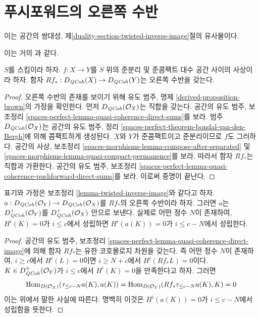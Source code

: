 \section{푸시포워드의 오른쪽 수반}
\label{section-twisted-inverse-image}

\noindent
이는 공간의 쌍대성, 제\ref{duality-section-twisted-inverse-image}절의
유사물이다.

\begin{lemma}
\label{lemma-twisted-inverse-image}
\begin{reference}
이는 거의 \cite[Example 4.2]{Neeman-Grothendieck}과 같다.
\end{reference}
$S$를 스킴이라 하자.
$f : X \to Y$를 $S$ 위의 준분리 및 준콤팩트 대수 공간 사이의 사상이라 하자.
함자 $Rf_* : D_{\mathit{QCoh}}(X) \to D_{\mathit{QCoh}}(Y)$는 오른쪽 수반을 갖는다.
\end{lemma}

\begin{proof}
오른쪽 수반의 존재를 보이기 위해
유도 범주, 명제 \ref{derived-proposition-brown}의 가정을 확인한다.
먼저 $D_{\mathit{QCoh}}(\mathcal{O}_X)$는 직합을 갖는다. 공간의 유도 범주, 보조정리
\ref{spaces-perfect-lemma-quasi-coherence-direct-sums}를 보라.
범주 $D_{\mathit{QCoh}}(\mathcal{O}_X)$는 공간의 유도 범주, 정리
\ref{spaces-perfect-theorem-bondal-van-den-Bergh}에 의해 콤팩트하게 생성된다.
$X$와 $Y$가 준콤팩트이고 준분리이므로 $f$도 그러하다. 공간의 사상, 보조정리
\ref{spaces-morphisms-lemma-compose-after-separated} 및
\ref{spaces-morphisms-lemma-quasi-compact-permanence}를 보라.
따라서 함자 $Rf_*$는 직합과 가환한다. 공간의 유도 범주, 보조정리
\ref{spaces-perfect-lemma-quasi-coherence-pushforward-direct-sums}를 보라.
이로써 증명이 끝난다.
\end{proof}

\begin{lemma}
\label{lemma-twisted-inverse-image-bounded-below}
표기와 가정은 보조정리 \ref{lemma-twisted-inverse-image}와 같다고 하자.
$a : D_{\mathit{QCoh}}(\mathcal{O}_Y) \to D_{\mathit{QCoh}}(\mathcal{O}_X)$를
$Rf_*$의 오른쪽 수반이라 하자. 그러면 $a$는
$D^+_{\mathit{QCoh}}(\mathcal{O}_Y)$를 $D^+_{\mathit{QCoh}}(\mathcal{O}_X)$ 안으로 보낸다.
실제로 어떤 정수 $N$이 존재하여,
$H^i(K) = 0$가 $i \leq c$에서 성립하면
$H^i(a(K)) = 0$가 $i \leq c - N$에서 성립한다.
\end{lemma}

\begin{proof}
공간의 유도 범주, 보조정리
\ref{spaces-perfect-lemma-quasi-coherence-direct-image}에 의해 함자
$Rf_*$는 유한 코호몰로지 차원을 갖는다. 즉 어떤 정수 $N$이 존재하여,
$i \geq c$에서 $H^i(L) = 0$이면 $i \geq N + c$에서
$H^i(Rf_*L) = 0$이다.
$K \in D^+_{\mathit{QCoh}}(\mathcal{O}_Y)$가 $i \leq c$에서
$H^i(K) = 0$을 만족한다고 하자. 그러면
$$
\mathop{\mathrm{Hom}}\nolimits_{D(\mathcal{O}_X)}(\tau_{\leq c - N}a(K), a(K)) =
\mathop{\mathrm{Hom}}\nolimits_{D(\mathcal{O}_Y)}(Rf_*\tau_{\leq c - N}a(K), K) = 0
$$
이는 위에서 말한 사실에 따른다. 명백히 이것은
$H^i(a(K)) = 0$가 $i \leq c - N$에서 성립함을 뜻한다.
\end{proof}

